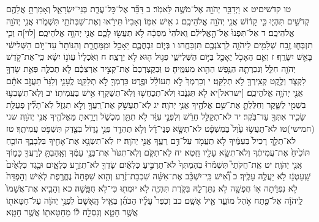\documentclass[twoside, openany, parskip=half, 11pt]{book}
\begin{document}
טו קדֹשיםיט א וַיְדַבֵּ֥ר יְהֹוָ֖ה אֶל־מֹשֶׁ֥ה לֵּאמֹֽר׃ ב דַּבֵּ֞ר אֶל־כׇּל־עֲדַ֧ת בְּנֵי־יִשְׂרָאֵ֛ל וְאָמַרְתָּ֥ אֲלֵהֶ֖ם קְדֹשִׁ֣ים תִּהְי֑וּ כִּ֣י קָד֔וֹשׁ אֲנִ֖י יְהֹוָ֥ה אֱלֹהֵיכֶֽם׃ ג אִ֣ישׁ אִמּ֤וֹ וְאָבִיו֙ תִּירָ֔אוּ וְאֶת־שַׁבְּתֹתַ֖י תִּשְׁמֹ֑רוּ אֲנִ֖י יְהֹוָ֥ה אֱלֹהֵיכֶֽם׃ ד אַל־תִּפְנוּ֙ אֶל־הָ֣אֱלִילִ֔ם וֵֽאלֹהֵי֙ מַסֵּכָ֔ה לֹ֥א תַעֲשׂ֖וּ לָכֶ֑ם אֲנִ֖י יְהֹוָ֥ה אֱלֹהֵיכֶֽם׃ [לוי]ה וְכִ֧י תִזְבְּח֛וּ זֶ֥בַח שְׁלָמִ֖ים לַיהֹוָ֑ה לִֽרְצֹנְכֶ֖ם תִּזְבָּחֻֽהוּ׃ ו בְּי֧וֹם זִבְחֲכֶ֛ם יֵאָכֵ֖ל וּמִֽמׇּחֳרָ֑ת וְהַנּוֹתָר֙ עַד־י֣וֹם הַשְּׁלִישִׁ֔י בָּאֵ֖שׁ יִשָּׂרֵֽף׃ ז וְאִ֛ם הֵאָכֹ֥ל יֵאָכֵ֖ל בַּיּ֣וֹם הַשְּׁלִישִׁ֑י פִּגּ֥וּל ה֖וּא לֹ֥א יֵרָצֶֽה׃ ח וְאֹֽכְלָיו֙ עֲוֺנ֣וֹ יִשָּׂ֔א כִּֽי־אֶת־קֹ֥דֶשׁ יְהֹוָ֖ה חִלֵּ֑ל וְנִכְרְתָ֛ה הַנֶּ֥פֶשׁ הַהִ֖וא מֵעַמֶּֽיהָ׃ ט וּֽבְקֻצְרְכֶם֙ אֶת־קְצִ֣יר אַרְצְכֶ֔ם לֹ֧א תְכַלֶּ֛ה פְּאַ֥ת שָׂדְךָ֖ לִקְצֹ֑ר וְלֶ֥קֶט קְצִֽירְךָ֖ לֹ֥א תְלַקֵּֽט׃ י וְכַרְמְךָ֙ לֹ֣א תְעוֹלֵ֔ל וּפֶ֥רֶט כַּרְמְךָ֖ לֹ֣א תְלַקֵּ֑ט לֶֽעָנִ֤י וְלַגֵּר֙ תַּעֲזֹ֣ב אֹתָ֔ם אֲנִ֖י יְהֹוָ֥ה אֱלֹהֵיכֶֽם׃ [ישראל]יא לֹ֖א תִּגְנֹ֑בוּ וְלֹא־תְכַחֲשׁ֥וּ וְלֹֽא־תְשַׁקְּר֖וּ אִ֥ישׁ בַּעֲמִיתֽוֹ׃ יב וְלֹֽא־תִשָּׁבְע֥וּ בִשְׁמִ֖י לַשָּׁ֑קֶר וְחִלַּלְתָּ֛ אֶת־שֵׁ֥ם אֱלֹהֶ֖יךָ אֲנִ֥י יְהֹוָֽה׃ יג לֹֽא־תַעֲשֹׁ֥ק אֶת־רֵֽעֲךָ֖ וְלֹ֣א תִגְזֹ֑ל לֹֽא־תָלִ֞ין פְּעֻלַּ֥ת שָׂכִ֛יר אִתְּךָ֖ עַד־בֹּֽקֶר׃ יד לֹא־תְקַלֵּ֣ל חֵרֵ֔שׁ וְלִפְנֵ֣י עִוֵּ֔ר לֹ֥א תִתֵּ֖ן מִכְשֹׁ֑ל וְיָרֵ֥אתָ מֵּאֱלֹהֶ֖יךָ אֲנִ֥י יְהֹוָֽה׃ שני (חמישי)טו לֹא־תַעֲשׂ֥וּ עָ֙וֶל֙ בַּמִּשְׁפָּ֔ט לֹא־תִשָּׂ֣א פְנֵי־דָ֔ל וְלֹ֥א תֶהְדַּ֖ר פְּנֵ֣י גָד֑וֹל בְּצֶ֖דֶק תִּשְׁפֹּ֥ט עֲמִיתֶֽךָ׃ טז לֹא־תֵלֵ֤ךְ רָכִיל֙ בְּעַמֶּ֔יךָ לֹ֥א תַעֲמֹ֖ד עַל־דַּ֣ם רֵעֶ֑ךָ אֲנִ֖י יְהֹוָֽה׃ יז לֹֽא־תִשְׂנָ֥א אֶת־אָחִ֖יךָ בִּלְבָבֶ֑ךָ הוֹכֵ֤חַ תּוֹכִ֙יחַ֙ אֶת־עֲמִיתֶ֔ךָ וְלֹא־תִשָּׂ֥א עָלָ֖יו חֵֽטְא׃ יח לֹֽא־תִקֹּ֤ם וְלֹֽא־תִטֹּר֙ אֶת־בְּנֵ֣י עַמֶּ֔ךָ וְאָֽהַבְתָּ֥ לְרֵעֲךָ֖ כָּמ֑וֹךָ אֲנִ֖י יְהֹוָֽה׃ יט אֶֽת־חֻקֹּתַי֮ תִּשְׁמֹ֒רוּ֒ בְּהֶמְתְּךָ֙ לֹא־תַרְבִּ֣יעַ כִּלְאַ֔יִם שָׂדְךָ֖ לֹא־תִזְרַ֣ע כִּלְאָ֑יִם וּבֶ֤גֶד כִּלְאַ֙יִם֙ שַֽׁעַטְנֵ֔ז לֹ֥א יַעֲלֶ֖ה עָלֶֽיךָ׃ כ וְ֠אִ֠ישׁ כִּֽי־יִשְׁכַּ֨ב אֶת־אִשָּׁ֜ה שִׁכְבַת־זֶ֗רַע וְהִ֤וא שִׁפְחָה֙ נֶחֱרֶ֣פֶת לְאִ֔ישׁ וְהׇפְדֵּה֙ לֹ֣א נִפְדָּ֔תָה א֥וֹ חֻפְשָׁ֖ה לֹ֣א נִתַּן־לָ֑הּ בִּקֹּ֧רֶת תִּהְיֶ֛ה לֹ֥א יוּמְת֖וּ כִּי־לֹ֥א חֻפָּֽשָׁה׃ כא וְהֵבִ֤יא אֶת־אֲשָׁמוֹ֙ לַֽיהֹוָ֔ה אֶל־פֶּ֖תַח אֹ֣הֶל מוֹעֵ֑ד אֵ֖יל אָשָֽׁם׃ כב וְכִפֶּר֩ עָלָ֨יו הַכֹּהֵ֜ן בְּאֵ֤יל הָֽאָשָׁם֙ לִפְנֵ֣י יְהֹוָ֔ה עַל־חַטָּאת֖וֹ אֲשֶׁ֣ר חָטָ֑א וְנִסְלַ֣ח ל֔וֹ מֵחַטָּאת֖וֹ אֲשֶׁ֥ר חָטָֽא׃
\end{document}
